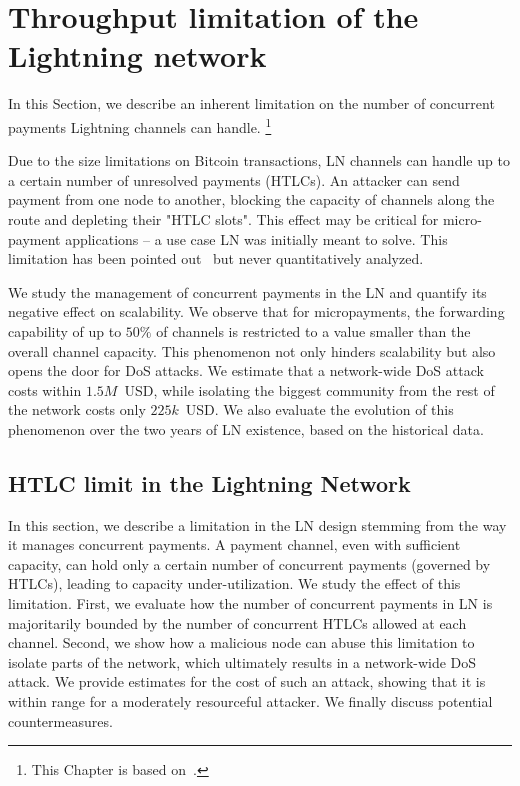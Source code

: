 \chapter{Throughput limitation of the Lightning network}

\label{Chapter08HTLClimit}

In this Section, we describe an inherent limitation on the number of concurrent payments Lightning channels can handle.
\footnote{This Chapter is based on~\cite{Tikhomirov2020a}.}

Due to the size limitations on Bitcoin transactions, LN channels can handle up to a certain number of unresolved payments (HTLCs).
An attacker can send payment from one node to another, blocking the capacity of channels along the route and depleting their "HTLC slots".
This effect may be critical for micro-payment applications -- a use case LN was initially meant to solve.
This limitation has been pointed out~\cite{EmelyanenkoK2017} but never quantitatively analyzed. 

We study the management of concurrent payments in the LN and quantify its negative effect on scalability. 
We observe that for micropayments, the forwarding capability of up to $50\%$ of channels is restricted to a value smaller than the overall channel capacity.
This phenomenon not only hinders scalability but also opens the door for DoS attacks.
We estimate that a network-wide DoS attack costs within $1.5M$~USD, while isolating the biggest community from the rest of the network costs only $225k$~USD.
We also evaluate the evolution of this phenomenon over the two years of LN existence, based on the historical data.


\section{HTLC limit in the Lightning Network}
\label{sec:attack}

In this section, we describe a limitation in the LN design 
stemming from the way it manages concurrent payments. 
A payment channel, even with sufficient capacity, can hold only 
a certain number of concurrent payments (governed by HTLCs), leading to capacity under-utilization. 
We study the effect of this limitation.
First, we evaluate how the number of concurrent payments in LN 
is majoritarily bounded by the number of concurrent HTLCs allowed at each channel. 
Second, we show how a malicious node can abuse this 
limitation to isolate parts of the network, 
which ultimately results in a network-wide DoS attack.
We provide estimates for the cost of such an attack, showing that it is within range for a moderately resourceful attacker. 
We finally discuss potential countermeasures.



